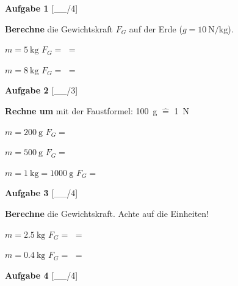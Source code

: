 \documentclass[11pt, a4paper]{article}
\newif\ifzeigesternchen
\newcommand{\luecke}[1]{\underline{\hspace{#1}}}
\newcommand{\punktebox}[1]{\hfill\small\textcolor{mittelgrau}{[\_\_/#1]}}
\newcommand{\stern}[1]{%
    \ifzeigesternchen%
        \textsuperscript{\textcolor{fachfarbe}{(#1)}}%
    \fi%
}
\newcommand{\aufgabe}[2]{%
    \needspace{4\baselineskip}%
    \vspace{10pt}%
    \noindent\textbf{\textcolor{fachfarbe}{Aufgabe #1}} #2%
    \vspace{4pt}%
    \nopagebreak[4]%
}
\newcommand{\operator}[1]{\textbf{\textcolor{fachfarbe}{#1}}}
\begin{document}
\vspace{0.3em}


\aufgabe{1}{\stern{*}} \punktebox{4}

\operator{Berechne} die Gewichtskraft $F_G$ auf der Erde ($g = \SI{10}{\newton\per\kilogram}$).

\vspace{0.2em}
\begin{teil}
    \item $m = \SI{5}{\kilogram}$ \hfill $F_G = $ \luecke{5cm} $= $ \luecke{2cm}
    \item $m = \SI{8}{\kilogram}$ \hfill $F_G = $ \luecke{5cm} $= $ \luecke{2cm}
\end{teil}


\aufgabe{2}{\stern{*}} \punktebox{3}

\operator{Rechne um} mit der Faustformel: \SI{100}{\gram} $\hat{=}$ \SI{1}{\newton}

\vspace{0.2em}
\begin{teil}
    \item $m = \SI{200}{\gram}$ \hfill $F_G = $ \luecke{2cm}
    \item $m = \SI{500}{\gram}$ \hfill $F_G = $ \luecke{2cm}
    \item $m = \SI{1}{\kilogram} = \SI{1000}{\gram}$ \hfill $F_G = $ \luecke{2cm}
\end{teil}


\aufgabe{3}{\stern{**}} \punktebox{4}

\operator{Berechne} die Gewichtskraft. Achte auf die Einheiten!

\vspace{0.2em}
\begin{teil}
    \item $m = \SI{2,5}{\kilogram}$ \hfill $F_G = $ \luecke{5cm} $= $ \luecke{2cm}
    \item $m = \SI{0,4}{\kilogram}$ \hfill $F_G = $ \luecke{5cm} $= $ \luecke{2cm}
\end{teil}

\newpage

\aufgabe{4}{\stern{**}} \punktebox{4}
\end{document}
